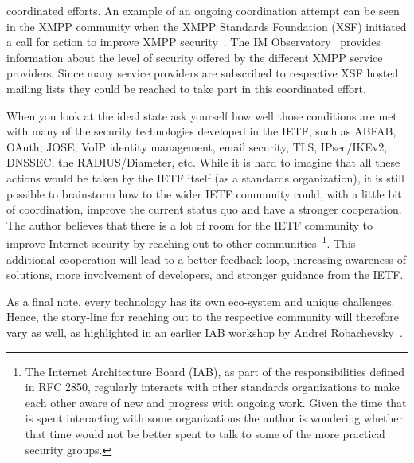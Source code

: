 \documentclass[peerreview, a4paper, 7pt]{IEEEtran}
\begin{document}
coordinated efforts. An example of an ongoing coordination attempt can be seen in the XMPP community when the XMPP Standards Foundation (XSF) initiated a call for action to improve XMPP security~\cite{manifesto}. The IM Observatory~\cite{IM-Observatory} provides information about the level of security offered by the different XMPP service providers. Since many service providers are subscribed to respective XSF hosted mailing lists they could be reached to take part in this coordinated effort. 

When you look at the ideal state ask yourself how well those conditions are met with many of the security technologies developed in the IETF, such as ABFAB, OAuth, JOSE, VoIP identity management, email security, TLS, IPsec/IKEv2, DNSSEC, the RADIUS/Diameter, etc. While it is hard to imagine that all these actions would be taken by the IETF itself (as a standards organization), it is still possible to brainstorm how to the wider IETF community could, with a little bit of coordination, improve the current status quo and have a stronger cooperation. The author believes that there is a lot of room for the IETF community to improve Internet security by reaching out to other communities~\footnote{The Internet Architecture Board (IAB), as part of the responsibilities defined in RFC 2850, regularly interacts with other standards organizations to make each other aware of new and progress with ongoing work. Given the time that is spent interacting with some organizations the author is wondering whether that time would not be better spent to talk to some of the more practical security groups.}. This additional cooperation will lead to a better feedback loop, increasing awareness of solutions, more involvement of developers, and stronger guidance from the IETF. 

As a final note, every technology has its own eco-system and unique challenges. Hence, the story-line for reaching out to the respective community will therefore vary as well, as highlighted in an earlier IAB workshop by Andrei Robachevsky~\cite{Robachevsky}. 
%

% 

\end{document}
